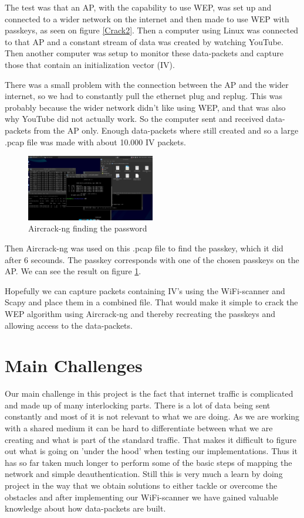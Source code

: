 The test was that an AP, with the capability to use WEP, was set up and connected to a wider network on the internet and then made to use WEP with passkeys, as seen on figure \ref{Crack2}. Then a computer using Linux was connected to that AP and a constant stream of data was created by watching YouTube. Then another computer was setup to monitor these data-packets and capture those that contain an initialization vector (IV). 

There was a small problem with the connection between the AP and the wider internet, so we had to constantly pull the ethernet plug and replug. This was probably because the wider network didn't like using WEP, and that was also why YouTube did not actually work. So the computer sent and received data-packets from the AP only. Enough data-packets where still created and so a large .pcap file was made with about 10.000 IV packets. 

\begin{figure}[!htbp]
    \centering
    \includegraphics[width=0.5\textwidth]{Latex-Files/Billeder/Kode1.png}
    \caption{Aircrack-ng finding the password}
    \label{Crack1}
\end{figure}


Then Aircrack-ng was used on this .pcap file to find the passkey, which it did after 6 secounds. The passkey corresponds with one of the chosen passkeys on the AP. We can see the result on figure \ref{Crack1}.

Hopefully we can capture packets containing IV's using the WiFi-scanner and Scapy and place them in a combined file. That would make it simple to crack the WEP algorithm using Aircrack-ng and thereby recreating the passkeys and allowing access to the data-packets. 

\section{Main Challenges}
Our main challenge in this project is the fact that internet traffic is complicated and made up of many interlocking parts. There is a lot of data being sent constantly and most of it is not relevant to what we are doing. As we are working with a shared medium it can be hard to differentiate between what we are creating and what is part of the standard traffic. That makes it difficult to figure out what is going on 'under the hood' when testing our implementations. Thus it has so far taken much longer to perform some of the basic steps of mapping the network and simple deauthentication. Still this is very much a learn by doing project in the way that we obtain solutions to either tackle or overcome the obstacles and after implementing our WiFi-scanner we have gained valuable knowledge about how data-packets are built. 

